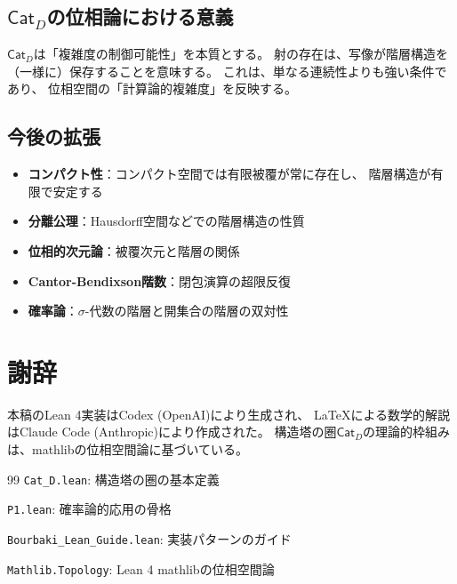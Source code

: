\documentclass[a4paper,12pt]{ltjsarticle}
\theoremstyle{definition}
\newcommand{\catD}{\mathsf{Cat}_D}
\begin{document}
\subsection{$\catD$の位相論における意義}

\begin{keybox}[title=Cat\_Dの本質]
$\catD$は「複雑度の制御可能性」を本質とする。
射の存在は、写像が階層構造を（一様に）保存することを意味する。
これは、単なる連続性よりも強い条件であり、
位相空間の「計算論的複雑度」を反映する。
\end{keybox}

\subsection{今後の拡張}

\begin{itemize}
  \item \textbf{コンパクト性}：コンパクト空間では有限被覆が常に存在し、
        階層構造が有限で安定する
  \item \textbf{分離公理}：Hausdorff空間などでの階層構造の性質
  \item \textbf{位相的次元論}：被覆次元と階層の関係
  \item \textbf{Cantor-Bendixson階数}：閉包演算の超限反復
  \item \textbf{確率論}：$\sigma$-代数の階層と開集合の階層の双対性
\end{itemize}

\section*{謝辞}

本稿のLean 4実装はCodex (OpenAI)により生成され、
\LaTeX による数学的解説はClaude Code (Anthropic)により作成された。
構造塔の圏$\catD$の理論的枠組みは、mathlibの位相空間論に基づいている。

\begin{thebibliography}{99}
\texttt{Cat\_D.lean}: 構造塔の圏の基本定義

\texttt{P1.lean}: 確率論的応用の骨格

\texttt{Bourbaki\_Lean\_Guide.lean}: 実装パターンのガイド

\texttt{Mathlib.Topology}: Lean 4 mathlibの位相空間論

\end{thebibliography}

\appendix
\end{document}
